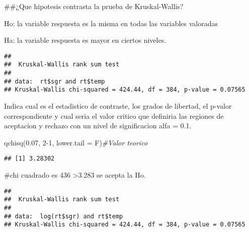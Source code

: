 \documentclass[
]{article}
\newenvironment{Shaded}{\begin{snugshade}}{\end{snugshade}}
\newcommand{\AttributeTok}[1]{\textcolor[rgb]{0.77,0.63,0.00}{#1}}
\newcommand{\CommentTok}[1]{\textcolor[rgb]{0.56,0.35,0.01}{\textit{#1}}}
\newcommand{\DecValTok}[1]{\textcolor[rgb]{0.00,0.00,0.81}{#1}}
\newcommand{\FloatTok}[1]{\textcolor[rgb]{0.00,0.00,0.81}{#1}}
\newcommand{\FunctionTok}[1]{\textcolor[rgb]{0.00,0.00,0.00}{#1}}
\newcommand{\NormalTok}[1]{#1}
\newcommand{\SpecialCharTok}[1]{\textcolor[rgb]{0.00,0.00,0.00}{#1}}
\begin{document}
\#\#¿Que hipotesis contrasta la prueba de Kruskal-Wallis?

Ho: la variable respuesta es la misma en todas las variables valoradas

Ha: la variable respuesta es mayor en ciertos niveles.

\begin{Shaded}
\end{Shaded}

\begin{verbatim}
## 
##  Kruskal-Wallis rank sum test
## 
## data:  rt$sgr and rt$temp
## Kruskal-Wallis chi-squared = 424.44, df = 384, p-value = 0.07565
\end{verbatim}

Indica cual es el estadistico de contraste, los grados de libertad, el
p-valor correspondiente y cual seria el valor critico que definiria las
regiones de aceptacion y rechazo con un nivel de significacion alfa =
0.1.

\begin{Shaded}
\begin{Highlighting}[]
\FunctionTok{qchisq}\NormalTok{(}\FloatTok{0.07}\NormalTok{, }\DecValTok{2{-}1}\NormalTok{, }\AttributeTok{lower.tail =}\NormalTok{ F)}\CommentTok{\#Valor teorico}
\end{Highlighting}
\end{Shaded}

\begin{verbatim}
## [1] 3.28302
\end{verbatim}

\#chi cuadrado es 436 \textgreater3.283 se acepta la Ho.

\begin{Shaded}
\end{Shaded}

\begin{verbatim}
## 
##  Kruskal-Wallis rank sum test
## 
## data:  log(rt$sgr) and rt$temp
## Kruskal-Wallis chi-squared = 424.44, df = 384, p-value = 0.07565
\end{verbatim}
\end{document}

